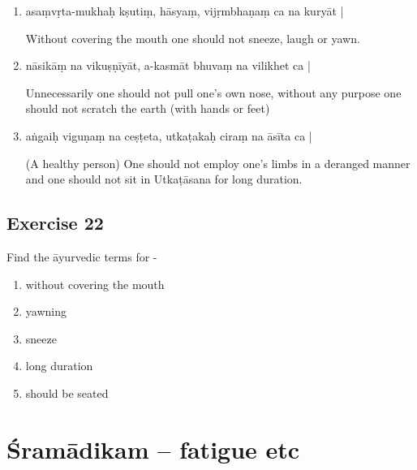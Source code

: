 \begin{enumerate}
\item {}

asaṃvṛta-mukhaḥ kṣutiṃ, hāsyaṃ,  vijṛmbhaṇaṃ ca na kuryāt | 

Without covering the mouth one should not sneeze, laugh or yawn. 

\item {}

nāsikāṃ na vikuṣṇīyāt, a-kasmāt bhuvaṃ na vilikhet ca | 

Unnecessarily one should not pull one's own nose, without any purpose one should not scratch the earth (with hands or feet)

\item {}

aṅgaiḥ viguṇaṃ na ceṣṭeta, utkaṭakaḥ ciraṃ na āsīta ca | 

(A healthy person) One should not employ one's limbs in a deranged manner and one should not sit in Utkaṭāsana for long duration.
\end{enumerate}

\begin{center}
\section*{Exercise 22}
\end{center}

Find the āyurvedic terms for -
\begin{enumerate}
\renewcommand{\theenumi}{\alph{enumi}}
\renewcommand{\labelenumi}{\theenumi.}
\item without covering the mouth
\item yawning 
\item sneeze 
\item long duration
\item should be seated
\end{enumerate}

\chapter{Śramādikam – fatigue etc}

